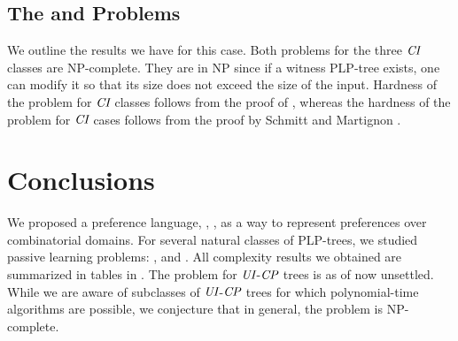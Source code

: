 \vspace{-0.1cm}
\subsection{The  and  Problems}

\vspace{-0.1cm}
We outline the results we have for this case. 
Both problems for the three $\textit{CI}$ classes are NP-complete. They are in 
NP since if a witness PLP-tree exists, one can modify it so that 
its size does not exceed the size of the input. Hardness of the 
 problem for $\textit{CI}$ classes follows from the proof of 
, whereas the hardness of the 
 problem for $\textit{CI}$ cases follows from the proof 
by Schmitt and Martignon .




\section{Conclusions}
We proposed a preference language, , , as a way to represent preferences over combinatorial 
domains. For several natural classes of PLP-trees, we studied passive learning 
problems: ,  and . All complexity
results we obtained are summarized in tables in . The
 problem for $\textit{UI}$-$\textit{CP}$ trees is as of now unsettled. While we are aware 
of subclasses of $\textit{UI}$-$\textit{CP}$ trees for which polynomial-time algorithms are 
possible, we conjecture that in general, the problem is NP-complete.

